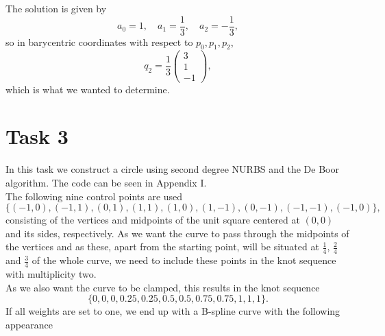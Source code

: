 \documentclass[]{article}
\begin{document}
The solution is given by \begin{equation*}
a_0 = 1, \quad a_1 = \frac{1}{3}, \quad a_2 = -\frac{1}{3},
\end{equation*}
so in barycentric coordinates with respect to $p_0, p_1, p_2$, \begin{equation*}
q_2 = \frac{1}{3}\left(\begin{array}{r}
3\\
1\\
-1
\end{array}\right),
\end{equation*}
which is what we wanted to determine.

\section*{Task 3}
In this task we construct a circle using second degree NURBS and the De Boor algorithm. The code can be seen in Appendix I.\\
The following nine control points are used \begin{equation*}
\{(-1, 0), (-1, 1), (0, 1), (1, 1), (1, 0), (1, -1), (0, -1), (-1, -1), (-1, 0)\},
\end{equation*}
consisting of the vertices and midpoints of the unit square centered at $(0, 0)$ and its sides, respectively. As we want the curve to pass through the midpoints of the vertices and as these, apart from the starting point, will be situated at $\frac{1}{4}$, $\frac{2}{4}$ and $\frac{3}{4}$ of the whole curve, we need to include these points in the knot sequence with multiplicity two.\\
As we also want the curve to be clamped, this results in the knot sequence \begin{equation*}
\{0, 0, 0, 0.25, 0.25, 0.5, 0.5, 0.75, 0.75, 1, 1, 1\}.
\end{equation*}
If all weights are set to one, we end up with a B-spline curve with the following appearance
\end{document}
